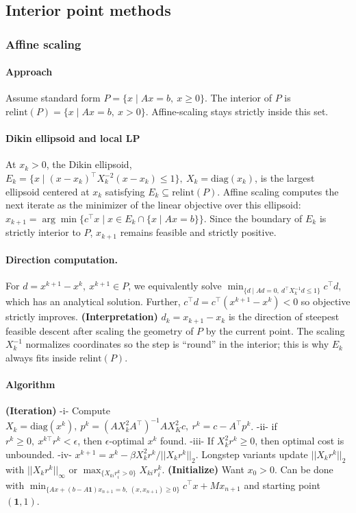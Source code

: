 \documentclass{article}
\begin{document}
\subsection{Interior point methods}
\subsubsection{Affine scaling}
\paragraph{Approach}
Assume standard form $P=\{x\mid Ax=b,\ x\ge0\}$. The interior of $P$ is $\text{relint}(P) = \{x\mid Ax=b,\ x>0\}$. Affine-scaling stays strictly inside this set.
\paragraph{Dikin ellipsoid and local LP}
At $x_k>0$, the Dikin ellipsoid, $E_k = \{x \mid (x-x_k)^\top X_k^{-2}(x-x_k) \le 1\},\ X_k=\mathrm{diag}(x_k)$, is the largest ellipsoid centered at $x_k$ satisfying $E_k\subseteq\text{relint}(P)$.  
Affine scaling computes the next iterate as the minimizer of the linear objective over this ellipsoid: $x_{k+1} = \arg\min\{c^\top x \mid x\in E_k \cap \{x\mid Ax=b\}\}$.
Since the boundary of $E_k$ is strictly interior to $P$, $x_{k+1}$ remains feasible and strictly positive.

\paragraph{Direction computation.} For $d = x^{k+1} - x^k,\ x^{k+1}\in P$, we equivalently solve $\min_{\{d\mid Ad=0,\ d^\top X_k^{-1}d \leq 1\}}c^\top d$, which has an analytical solution. Further, $c^\top d = c^\top (x^{k+1} - x^k) < 0$ so objective strictly improves. \textbf{(Interpretation)} $d_k = x_{k+1}-x_k$ is the direction of steepest feasible descent after scaling the geometry of $P$ by the current point. The scaling $X_k^{-1}$ normalizes coordinates so the step is “round” in the interior; this is why $E_k$ always fits inside $\text{relint}(P)$.

\paragraph{Algorithm} \textbf{(Iteration)} -i- Compute $X_k = \text{diag}(x^k),\ p^k = (AX_k^2A^\top)^{-1}AX_K^2c,\ r^k = c - A^\top p^k$. -ii- if $r^k\geq 0,\ x^{k\top}r^k < \epsilon$, then $\epsilon$-optimal $x^k$ found. -iii- If $X^{2}_kr^k \geq 0$, then optimal cost is unbounded. -iv- $x^{k+1} = x^k - \beta X_k^2r^k / ||X_kr^k||_2$. Longstep variants update $||X_kr^k||_2$ with $||X_kr^k||_\infty$ or $\max_{\{X_{ki}r^k_i > 0\}}X_{ki}r^k_i$. \textbf{(Initialize)} Want $x_0 > 0$. Can be done with $\min_{\{Ax + (b - A\mathbf{1})x_{n+1} = b,\ (x,x_{n+1})\geq 0\}} c^\top x + Mx_{n+1}$ and starting point $(\mathbf{1}, 1)$.
\end{document}
